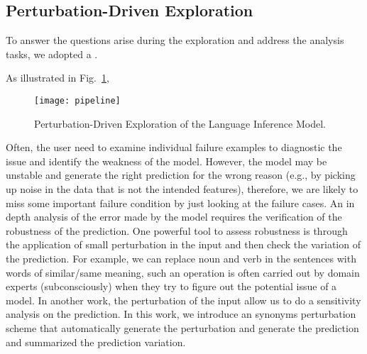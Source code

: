 \subsection{Perturbation-Driven Exploration}
To answer the questions arise during the exploration and address the analysis tasks, we adopted a .

As illustrated in Fig.~\ref{fig:modelPipeline},

\begin{figure}[htbp]
\centering
\vspace{-2mm}
 \texttt{[image: pipeline]}
 \caption{
 Perturbation-Driven Exploration of the Language Inference Model.
 }
\label{fig:modelPipeline}
\end{figure}

Often, the user need to examine individual failure examples to diagnostic the
issue and identify the weakness of the model.
%
However, the model may be unstable and generate the right prediction for the wrong
reason (e.g., by picking up noise in the data that is not the intended features),
therefore, we are likely to miss some important failure condition by just looking
at the failure cases.
%
An in depth analysis of the error made by the model requires the verification of
the robustness of the prediction.
%
One powerful tool to assess robustness is through the application of small
perturbation in the input and then check the variation of the prediction.
%
For example, we can replace noun and verb in the sentences with words of
similar/same meaning, such an operation is often carried out by domain experts
(subconsciously) when they try to figure out the potential issue of a model.
%
In another work, the perturbation of the input allow us to do a sensitivity
analysis on the prediction.
%
In this work, we introduce an synonyms perturbation scheme that automatically
generate the perturbation and generate the prediction and summarized the prediction
variation.
%




